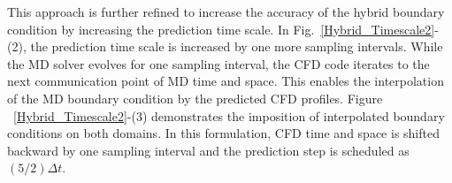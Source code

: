 \documentclass[preprint,12pt]{elsarticle}
\begin{document}

This approach is further refined to increase the accuracy of the hybrid boundary condition by increasing the prediction time scale. In Fig.~\ref{Hybrid_Timescale2}-(2), the prediction time scale is increased by one more sampling intervals. While the MD solver evolves for one sampling interval, the CFD code iterates to the next communication point of MD time and space. This enables the interpolation of the MD boundary condition by the predicted CFD profiles. Figure ~\ref{Hybrid_Timescale2}-(3) demonstrates the imposition of interpolated boundary conditions on both domains. In this formulation, CFD time and space is shifted backward by one sampling interval and the prediction step is scheduled as $(5/2){\Delta}t$.


\end{document}
